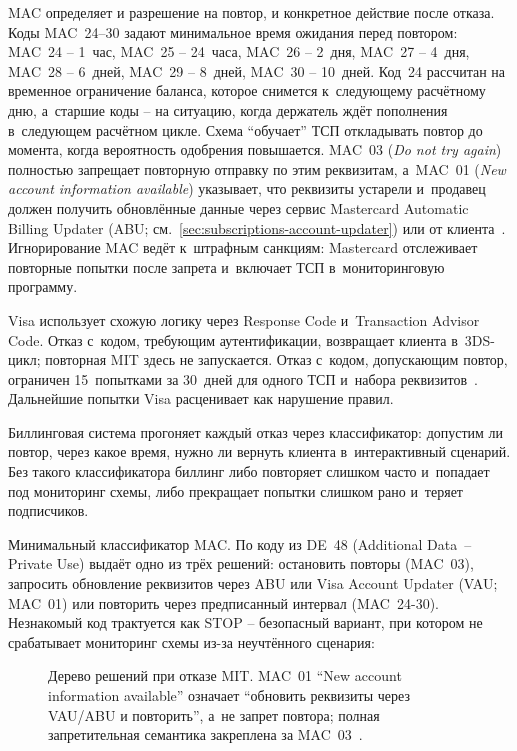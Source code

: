 MAC определяет и разрешение на повтор, и конкретное действие после
отказа. Коды MAC~24--30 задают минимальное время ожидания перед
повтором: MAC~24 -- 1~час, MAC~25 -- 24~часа, MAC~26 -- 2~дня,
MAC~27 -- 4~дня, MAC~28 -- 6~дней, MAC~29 -- 8~дней, MAC~30 -- 10~дней.
Код~24 рассчитан на временное ограничение баланса, которое снимется
к~следующему расчётному дню, а~старшие коды -- на ситуацию, когда
держатель ждёт пополнения в~следующем расчётном цикле. Схема \enquote{обучает} ТСП
откладывать повтор до момента, когда вероятность одобрения
повышается. MAC~03
(\textit{Do not try again}) полностью запрещает повторную
отправку по этим реквизитам, а~MAC~01
(\textit{New account information available}) указывает, что
реквизиты устарели и~продавец должен получить обновлённые данные
через сервис Mastercard Automatic Billing Updater (ABU; см.~\autoref{sec:subscriptions-account-updater})
или от клиента~\cite{mc-tpr,mc-abu}. Игнорирование MAC
ведёт к~штрафным санкциям: Mastercard отслеживает повторные
попытки после запрета и~включает ТСП в~мониторинговую
программу.

Visa использует схожую логику через Response Code и~Transaction
Advisor Code. Отказ с~кодом, требующим аутентификации, возвращает
клиента в~3DS-цикл; повторная MIT здесь не запускается. Отказ с~кодом,
допускающим повтор, ограничен 15~попытками за 30~дней для
одного ТСП и~набора реквизитов~\cite{visa-core-rules}.
Дальнейшие попытки Visa расценивает как нарушение правил.

Биллинговая система прогоняет каждый отказ через классификатор:
допустим ли повтор, через какое время, нужно ли вернуть клиента
в~интерактивный сценарий. Без такого классификатора биллинг
либо повторяет слишком часто и~попадает под мониторинг схемы,
либо прекращает попытки слишком рано и~теряет подписчиков.

Минимальный классификатор MAC. По коду из DE~48 (Additional Data~--
Private Use) выдаёт одно
из трёх решений: остановить повторы (MAC~03), запросить обновление
реквизитов через ABU или Visa Account Updater (VAU; MAC~01) или повторить через предписанный
интервал (MAC~24-30). Незнакомый код трактуется как STOP --
безопасный вариант, при котором не срабатывает мониторинг схемы
из-за неучтённого сценария:


\begin{figure}[tbp]
  \centering
  \caption{Дерево решений при отказе MIT. MAC~01 \enquote{New account
  information available} означает \enquote{обновить реквизиты через
  VAU/ABU и повторить}, а~не запрет повтора; полная запретительная
  семантика закреплена за MAC~03~\cite{tabapay-mac}.}\label{fig:decline-decision-tree}
\end{figure}

